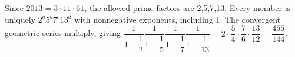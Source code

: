 Since $2013=3\cdot11\cdot61$, the allowed prime factors are 2,5,7,13. Every member is uniquely $2^a5^b7^c13^d$ with nonnegative exponents, including 1. The convergent geometric series multiply, giving $\dfrac{1}{1-\dfrac{1}{2}}\dfrac{1}{1-\dfrac{1}{5}}\dfrac{1}{1-\dfrac{1}{7}}\dfrac{1}{1-\dfrac{1}{13}}=2\cdot\dfrac{5}{4}\cdot\dfrac{7}{6}\cdot\dfrac{13}{12}=\boxed{\dfrac{455}{144}}$.
